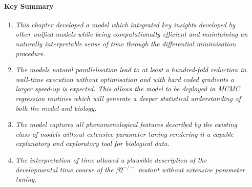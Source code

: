 \paragraph{Key Summary}

\begin{enumerate}
	\item \textit{This chapter developed a model which integrated key insights developed by other unified models while being computationally efficient and maintaining an naturally interpretable sense of time through the differential minimisation procedure.}
	\item \textit{The models natural parallelisation lead to at least a hundred-fold reduction in wall-time execution without optimisation and with hard coded gradients a larger speed-up is expected. This allows the model to be deployed in MCMC regression routines which will generate a deeper statistical understanding of both the model and biology.}
	\item \textit{The model captures all phenomenological features described by the existing class of models without extensive parameter tuning rendering it a capable explanatory and exploratory tool for biological data.}
	\item \textit{The interpretation of time allowed a plausible description of the developmental time course of the $\beta2^{-/-}$ mutant without extensive parameter tuning.}
\end{enumerate}
